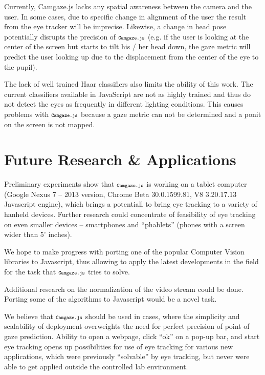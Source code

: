 \documentclass[annual]{acmsiggraph}
\newcommand{\Acronym}[1]{\ensuremath{{\small{\texttt{#1}}}}}
\newcommand{\Name}{\Acronym{Camgaze.js}} \newcommand{\False}{\Constant{false}}
\newcommand{\Constant}[1]{\ensuremath{\small{\texttt{#1}}}}
\begin{document}
Currently, Camgaze.js lacks any spatial awareness between the camera and the
user. In some cases, due to specific change in alignment of the user the result
from the eye tracker will be imprecise. Likewise, a change in head pose
potentially disrupts the precision of $\Name$ (e.g. if the user is looking at
the center of the screen but starts to tilt his / her head down, the gaze
metric will predict the user looking up due to the displacement from the center
of the eye to the pupil).

The lack of well trained Haar classifiers also limits the ability of this work.
The current classifiers available in JavaScript are not as highly trained and
thus do not detect the eyes as frequently in different lighting conditions.
This causes problems with $\Name$ because a gaze metric can not be determined
and a ponit on the screen is not mapped.


\section{Future Research \& Applications}

Preliminary experiments show that $\Name$ is working on a tablet computer
(Google Nexus 7 -- 2013 version, Chrome Beta 30.0.1599.81, V8 3.20.17.13
Javascript engine), which brings a potentiall to bring eye tracking to a
variety of hanheld devices. Further research could concentrate of feasibility
of eye tracking on even smaller devices -- smartphones and “phablets” (phones
with a screen wider than 5’ inches).

We hope to make progress with porting one of the popular Computer Vision
libraries to Javascript, thus allowing to apply the latest developments in the
field for the task that $\Name$ tries to solve.

Additional research on the normalization of the video stream could be done.
Porting some of the algorithms to Javascript would be a novel task.

We believe that $\Name$ should be used in cases, where the simplicity and
scalability of deployment overweights the need for perfect precision of point
of gaze prediction. Ability to open a webpage, click “ok” on a pop-up bar, and
start eye tracking opens up possibilities for use of eye tracking for various
new applications, which were previously “solvable” by eye tracking, but never
were able to get applied outside the controlled lab environment.
\end{document}
